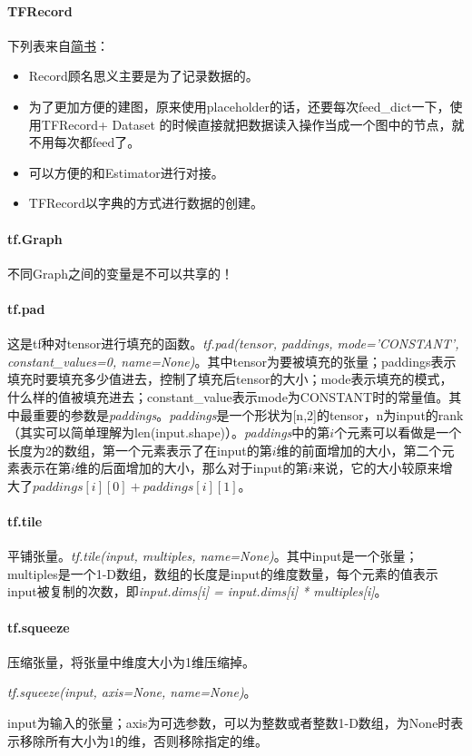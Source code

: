 \paragraph{TFRecord}
下列表来自\href{https://www.jianshu.com/p/72596a8488c3}{简书}：
\begin{itemize}
	\item Record顾名思义主要是为了记录数据的。
	\item 为了更加方便的建图，原来使用placeholder的话，还要每次feed\_dict一下，使用TFRecord+ Dataset 的时候直接就把数据读入操作当成一个图中的节点，就不用每次都feed了。
	\item 可以方便的和Estimator进行对接。
	\item TFRecord以字典的方式进行数据的创建。
\end{itemize}

\paragraph{tf.Graph}
不同Graph之间的变量是不可以共享的！


\paragraph{tf.pad}
这是tf种对tensor进行填充的函数。\textit{tf.pad(tensor, paddings, mode='CONSTANT', constant\_values=0, name=None)}。其中tensor为要被填充的张量；paddings表示填充时要填充多少值进去，控制了填充后tensor的大小；mode表示填充的模式，什么样的值被填充进去；constant\_value表示mode为CONSTANT时的常量值。其中最重要的参数是\textit{paddings}。\textit{paddings}是一个形状为[n,2]的tensor，n为input的rank（其实可以简单理解为len(input.shape)）。\textit{paddings}中的第$i$个元素可以看做是一个长度为2的数组，第一个元素表示了在input的第$i$维的前面增加的大小，第二个元素表示在第$i$维的后面增加的大小，那么对于input的第$i$来说，它的大小较原来增大了$paddings[i][0]+paddings[i][1]$。

\paragraph{tf.tile}平铺张量。\textit{tf.tile(input, multiples, name=None)}。其中input是一个张量；multiples是一个1-D数组，数组的长度是input的维度数量，每个元素的值表示input被复制的次数，即\textit{input.dims[i] = input.dims[i] * multiples[i]}。

\paragraph{tf.squeeze}压缩张量，将张量中维度大小为1维压缩掉。

\textit{tf.squeeze(input, axis=None, name=None)}。

input为输入的张量；axis为可选参数，可以为整数或者整数1-D数组，为None时表示移除所有大小为1的维，否则移除指定的维。
